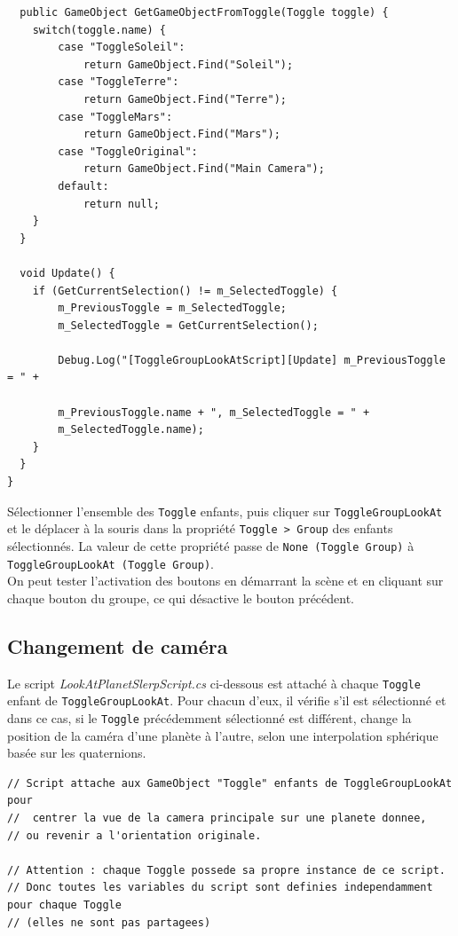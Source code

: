 \documentclass[a4paper,10pt]{article}
\newenvironment{solution}%
{\begin{tcolorbox}[breakable,colback=red!5!white,colframe=red!75!black,title=Solution]}%
{\end{tcolorbox}}
\begin{document}
\begin{solution}
\begin{lstlisting}
  public GameObject GetGameObjectFromToggle(Toggle toggle) {
	switch(toggle.name) {
		case "ToggleSoleil":
			return GameObject.Find("Soleil");
		case "ToggleTerre":
			return GameObject.Find("Terre");
		case "ToggleMars":
			return GameObject.Find("Mars");
		case "ToggleOriginal":
			return GameObject.Find("Main Camera");
		default:
			return null;
	}
  }

  void Update() {
	if (GetCurrentSelection() != m_SelectedToggle) {
		m_PreviousToggle = m_SelectedToggle;
		m_SelectedToggle = GetCurrentSelection();

		Debug.Log("[ToggleGroupLookAtScript][Update] m_PreviousToggle = " +

		m_PreviousToggle.name + ", m_SelectedToggle = " +
		m_SelectedToggle.name);
	}
  }
}
\end{lstlisting}

Sélectionner l'ensemble des \texttt{Toggle} enfants, puis cliquer sur \texttt{ToggleGroupLookAt} et le déplacer à la souris dans la propriété \texttt{Toggle > Group} des enfants sélectionnés. La valeur de cette propriété passe de \texttt{None (Toggle Group)} à \texttt{ToggleGroupLookAt (Toggle Group)}.\\

On peut tester l'activation des boutons en démarrant la scène et en cliquant sur chaque bouton du groupe, ce qui désactive le bouton précédent.

\subsection{Changement de caméra}

Le script \textit{LookAtPlanetSlerpScript.cs} ci-dessous est attaché à chaque \texttt{Toggle} enfant de \texttt{ToggleGroupLookAt}. Pour chacun d'eux, il vérifie s'il est sélectionné et dans ce cas,  si le \texttt{Toggle} précédemment sélectionné est différent, change la position de la caméra d'une planète à l'autre, selon une interpolation sphérique basée sur les quaternions.

\begin{lstlisting}
// Script attache aux GameObject "Toggle" enfants de ToggleGroupLookAt pour
//  centrer la vue de la camera principale sur une planete donnee, 
// ou revenir a l'orientation originale.

// Attention : chaque Toggle possede sa propre instance de ce script.
// Donc toutes les variables du script sont definies independamment pour chaque Toggle
// (elles ne sont pas partagees)


\end{lstlisting}
\end{solution}
\end{document}
